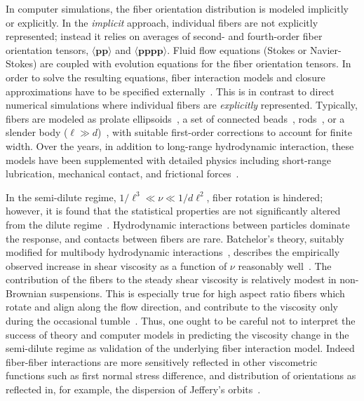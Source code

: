 \documentclass[preprint, 10pt]{elsarticle}
\begin{document}
In computer simulations, the fiber orientation distribution is modeled
implicitly or explicitly. In the \emph{implicit} approach, individual
fibers are not explicitly represented; instead it relies on averages of
second- and fourth-order fiber orientation tensors, $\langle \mathbf{p
p} \rangle$ and $\langle \mathbf{p p p p} \rangle$. Fluid flow equations
(Stokes or Navier-Stokes) are coupled with evolution equations for the
fiber orientation tensors. In order to solve the resulting equations,
fiber interaction models and closure approximations have to be specified
externally~\cite{Advani1987, Advani1990, Ferec2014, Perez2017}. This is
in contrast to direct numerical simulations where individual fibers are
\emph{explicitly} represented. Typically, fibers are modeled as
prolate ellipsoids~\cite{Ausias2006}, a set of connected
beads~\cite{Yamamoto1996, Joung2001}, rods~\cite{Schmid2000,
Lindstroem2007}, or a slender body ($\ell \gg d$)~\cite{Fan1998,
Rahnama1995, tor-she2004, tor-gus2006, gus-tor2009}, with suitable
first-order corrections to account for finite width. Over the years, in
addition to long-range hydrodynamic interaction, these models have been
supplemented with detailed physics including short-range lubrication,
mechanical contact, and frictional forces~\cite{Sundararajakumar1997,
Lindstroem2008}.

In the semi-dilute regime, $1/\ell^3 \ll \nu \ll 1/d\ell^2$, fiber
rotation is hindered; however, it is found that the statistical
properties are not significantly altered from the dilute
regime~\cite{larsoncf}.  Hydrodynamic interactions between particles
dominate the response, and contacts between fibers are rare. Batchelor's
theory, suitably modified for multibody hydrodynamic
interactions~\cite{Shaqfeh1990, Mackaplow1996}, describes the
empirically observed increase in shear viscosity as a function of $\nu$
reasonably well~\cite{Stover1992, Bibbo1987, Petrich2000}. The
contribution of the fibers to the steady shear viscosity is relatively
modest in non-Brownian suspensions. This is especially true for high
aspect ratio fibers which rotate and align along the flow direction, and
contribute to the viscosity only during the occasional
tumble~\cite{larsoncf}.  Thus, one ought to be careful not to interpret
the success of theory and computer models in predicting the viscosity
change in the semi-dilute regime as validation of the underlying fiber
interaction model. Indeed fiber-fiber interactions are more sensitively
reflected in other viscometric functions such as first normal stress
difference, and distribution of orientations as reflected in, for
example, the dispersion of Jeffery's orbits~\cite{Lindstroem2009}.
\end{document}
